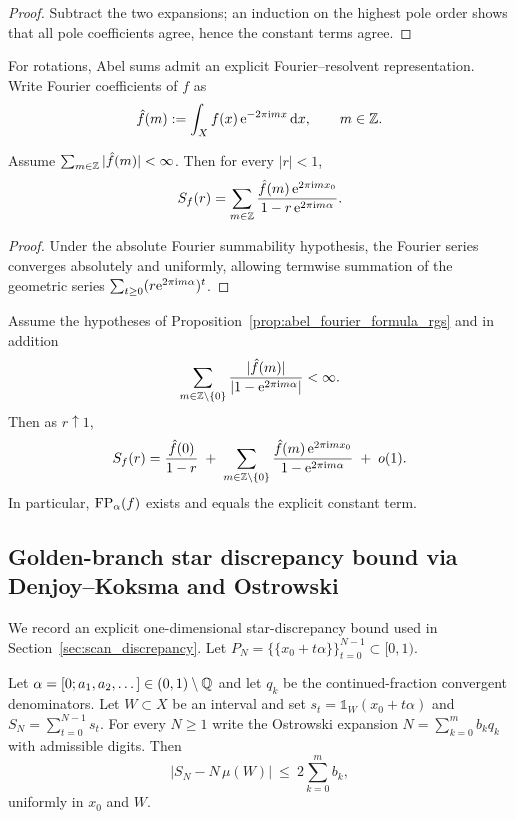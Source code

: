 \begin{proof}
Subtract the two expansions; an induction on the highest pole order shows that all pole coefficients agree, hence the constant terms agree.
\end{proof}

For rotations, Abel sums admit an explicit Fourier--resolvent representation.
Write Fourier coefficients of $f$ as
\[
\hat f(m):=\int_X f(x)\,\mathrm{e}^{-2\pi\mathrm{i} m x}\,\mathrm{d} x,\qquad m\in\mathbb{Z}.
\]

\begin{proposition}
\label{prop:abel_fourier_formula_rgs}
Assume $\sum_{m\in\mathbb{Z}}|\hat f(m)|<\infty$.
Then for every $|r|<1$,
\[
S_f(r)=\sum_{m\in\mathbb{Z}}\frac{\hat f(m)\,\mathrm{e}^{2\pi\mathrm{i} m x_0}}{1-r\,\mathrm{e}^{2\pi\mathrm{i} m\alpha}}.
\]
\end{proposition}

\begin{proof}
Under the absolute Fourier summability hypothesis, the Fourier series converges absolutely and uniformly, allowing termwise summation of the geometric series $\sum_{t\ge 0}(r\mathrm{e}^{2\pi\mathrm{i} m\alpha})^t$.
\end{proof}

\begin{corollary}
\label{cor:abel_fp_fourier_rgs}
Assume the hypotheses of Proposition~\ref{prop:abel_fourier_formula_rgs} and in addition
\[
\sum_{m\in\mathbb{Z}\setminus\{0\}}\frac{|\hat f(m)|}{|1-\mathrm{e}^{2\pi\mathrm{i} m\alpha}|}<\infty.
\]
Then as $r\uparrow 1$,
\[
S_f(r)=\frac{\hat f(0)}{1-r}
\;+\;
\sum_{m\in\mathbb{Z}\setminus\{0\}}\frac{\hat f(m)\,\mathrm{e}^{2\pi\mathrm{i} m x_0}}{1-\mathrm{e}^{2\pi\mathrm{i} m\alpha}}
\;+\;o(1).
\]
In particular, $\mathrm{FP}_{\alpha}(f)$ exists and equals the explicit constant term.
\end{corollary}

\subsection{Golden-branch star discrepancy bound via Denjoy--Koksma and Ostrowski}
\label{app:golden_discrepancy_bound}

We record an explicit one-dimensional star-discrepancy bound used in Section~\ref{sec:scan_discrepancy}.
Let $P_N=\{\{x_0+t\alpha\}\}_{t=0}^{N-1}\subset[0,1)$.

\begin{theorem}
\label{thm:dk_ostrowski_rgs}
Let $\alpha=[0;a_1,a_2,\dots]\in(0,1)\setminus\mathbb{Q}$ and let $q_k$ be the continued-fraction convergent denominators.
Let $W\subset X$ be an interval and set $s_t=\mathds{1}_W(x_0+t\alpha)$ and $S_N=\sum_{t=0}^{N-1} s_t$.
For every $N\ge 1$ write the Ostrowski expansion $N=\sum_{k=0}^{m} b_k q_k$ with admissible digits.
Then
\[
\bigl|S_N-N\,\mu(W)\bigr|\ \le\ 2\sum_{k=0}^{m} b_k,
\]
uniformly in $x_0$ and $W$.
\end{theorem}

